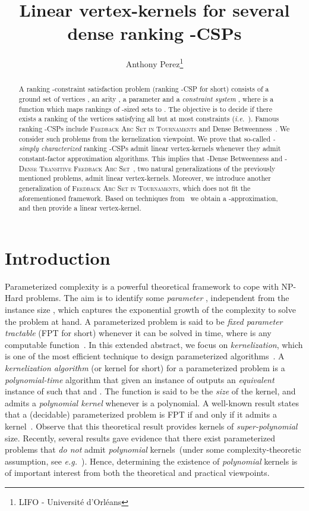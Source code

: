 \documentclass[11pt]{article}
\title{Linear vertex-kernels for several dense ranking -CSPs}
\author{Anthony Perez\thanks{LIFO - Universit\'e d'Orl\'eans}}
\date{}
\def\ie{{\em i.e.}~}
\newcommand{\BIT}{{\sc Dense Betweenness}}
\newcommand{\FAST}{\textsc{Feedback Arc Set in Tournaments}}
\newcommand{\rBIT}{{\sc -Dense Betweenness}}
\newcommand{\rFAST}{\textsc{-Dense Transitive Feedback Arc Set}}
\begin{document}
\maketitle

\begin{abstract}

\noindent A {\sc ranking -constraint satisfaction} problem (ranking -CSP for short) consists of a ground set of vertices , an arity 
, a parameter  and a \emph{constraint system} , where  is a function which maps 
rankings of -sized sets  to . The objective is to 
decide if there exists a ranking  of the vertices satisfying all but at most  constraints (\ie ). Famous 
ranking -CSPs include \FAST{} and \BIT{}~\cite{ALS09,KS10}. We consider such problems from the kernelization viewpoint.
We prove that so-called \emph{-simply characterized} ranking -CSPs admit linear vertex-kernels whenever they admit constant-factor approximation algorithms. This implies that 
\rBIT{} and \rFAST{}~\cite{KS10}, two natural generalizations of the previously mentioned problems, admit linear vertex-kernels. Moreover, we introduce another generalization of \FAST{}, which does not fit the aforementioned framework. Based on techniques from~\cite{CFR06} we obtain a -approximation, and then provide a linear vertex-kernel. 
\end{abstract}

\section*{Introduction}
\label{sec:intro}

Parameterized complexity is a powerful theoretical framework to cope with NP-Hard problems. The aim is to identify some \emph{parameter} , 
independent from the instance size , which captures the exponential growth of the complexity to solve 
the problem at hand. A parameterized problem is said to be \emph{fixed parameter tractable} (FPT for short) whenever it can be solved in  time, 
where  is any computable function~\cite{DF99,Nie06}. In this extended abstract, we focus on \emph{kernelization}, which is one of the most efficient technique to design parameterized algorithms~\cite{Bod09}. A \emph{kernelization algorithm} (or kernel for short) 
for a parameterized problem  is a \emph{polynomial-time} algorithm that given an 
instance  of  outputs an \emph{equivalent} instance  of  
such that  and . The function  is said to be 
the \emph{size} of the kernel, and  admits a \emph{polynomial kernel} 
whenever  is a polynomial. A well-known result states that a (decidable) parameterized problem 
is FPT if and only if it admits a kernel~\cite{Nie06}. Observe that this theoretical result provides kernels of \emph{super-polynomial} size. 
Recently, several results gave evidence that 
there exist parameterized problems that \emph{do not} admit \emph{polynomial} kernels~(under some complexity-theoretic assumption, see \emph{e.g.}~\cite{BDFH09,BJK11}). Hence, determining the existence of \emph{polynomial} kernels is of important interest from both 
the theoretical and practical viewpoints.  \\
\end{document}
